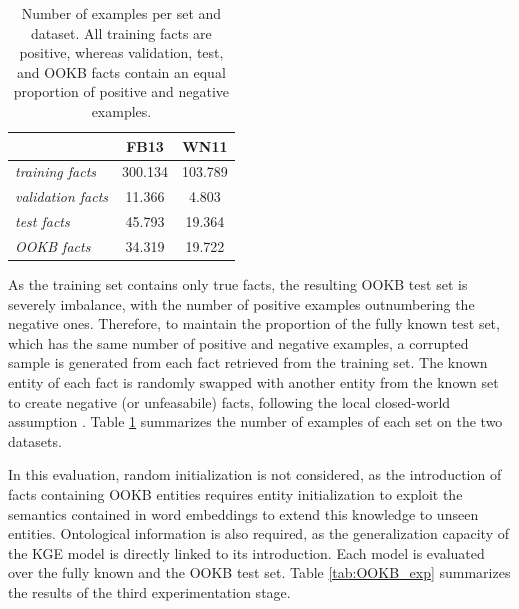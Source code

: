 \begin{table} 
\centering
\begin{tabular}{l|c|c|}
\cline{2-3}
\textit{}                                       & FB13    & WN11    \\ \hline
\multicolumn{1}{|l|}{\textit{training facts}}   & 300.134 & 103.789 \\ \hline
\multicolumn{1}{|l|}{\textit{validation facts}} & 11.366  & 4.803   \\ \hline
\multicolumn{1}{|l|}{\textit{test facts}}       & 45.793  & 19.364  \\ \hline
\multicolumn{1}{|l|}{\textit{OOKB facts}}      & 34.319  & 19.722  \\ \hline
\end{tabular}
\caption{Number of examples per set and dataset. All training facts are positive, whereas validation, test, and OOKB facts contain an equal proportion of positive and negative examples.}
\label{tab:OOKB_proportions}
\end{table}

As the training set contains only true facts, the resulting OOKB test set is severely imbalance, with the number of positive examples outnumbering the negative ones. Therefore, to maintain the proportion of the fully known test set, which has the same number of positive and negative examples, a corrupted sample is generated from each fact retrieved from the training set. The known entity of each fact is randomly swapped with another entity from the known set to create negative (or unfeasabile) facts, following the local closed-world assumption \cite{Reiter1978}. Table \ref{tab:OOKB_proportions} summarizes the number of examples of each set on the two datasets.

In this evaluation, random initialization is not considered, as the introduction of facts containing OOKB entities requires entity initialization to exploit the semantics contained in word embeddings to extend this knowledge to unseen entities. Ontological information is also required, as the generalization capacity of the KGE model is directly linked to its introduction. Each model is evaluated over the fully known and the OOKB test set. Table \ref{tab:OOKB_exp} summarizes the results of the third experimentation stage.

